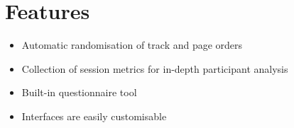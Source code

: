 \vspace{-0.8cm}
\section{Features}

\begin{itemize}[noitemsep,nolistsep]
	\item Automatic randomisation of track and page orders
	\item Collection of session metrics for in-depth participant analysis
	\item Built-in questionnaire tool
	\item Interfaces are easily customisable
\end{itemize}

\vspace{-0.6cm}